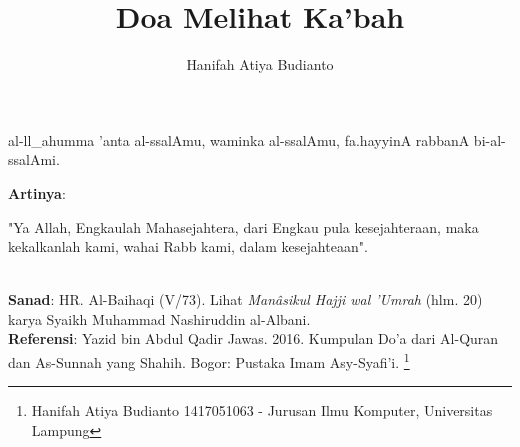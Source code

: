 \documentclass[a4paper,12pt]{article}
\title{\Large Doa Melihat Ka'bah}
\author{\calligra Hanifah Atiya Budianto}
\begin{document}
\sffamily
\maketitle 
\fullvocalize
{}
\begin{arabtext}
\noindent
al-ll_ahumma 'anta al-ssalAmu, waminka al-ssalAmu, fa.hayyinA rabbanA 
bi-al-ssalAmi.\\
\end{arabtext}
\noindent
\textbf{Artinya}:
\par
\indent
"Ya Allah, Engkaulah Mahasejahtera, dari Engkau pula kesejahteraan, maka 
kekalkanlah kami, wahai Rabb kami, dalam kesejahteaan".\\\\
\par
\noindent
\textbf{Sanad}: HR. Al-Baihaqi (V/73). Lihat \textit{Man\^{a}sikul Hajji 
wal 'Umrah} (hlm. 20) karya Syaikh Muhammad Nashiruddin al-Albani.\\
\textbf{Referensi}: Yazid bin Abdul Qadir Jawas. 2016. Kumpulan Do'a dari
Al-Quran dan As-Sunnah yang Shahih. Bogor: Pustaka Imam Asy-Syafi'i.
\footnote{Hanifah Atiya Budianto 1417051063 - Jurusan Ilmu Komputer,
Universitas Lampung}
\end{document}
